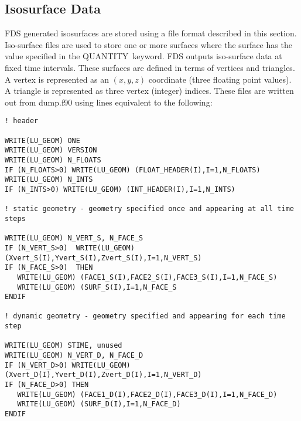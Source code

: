 \documentclass[12pt]{article}
\begin{document}
\subsection{Isosurface Data}
\label{out:ISOSURFACE}

FDS generated isosurfaces are stored using a
file format described in this section.
Iso-surface files are used to store one or more surfaces where the
surface has the value specified in the {\ct QUANTITY}\ keyword.
FDS outputs iso-surface data at fixed time intervals.
These surfaces are defined in terms of vertices and triangles.
A vertex is represented as an $(x,y,z)$ coordinate (three floating point values).
A triangle is represented as three vertex (integer) indices.
These files are written out from {\ct dump.f90} using lines equivalent to the following:
\begin{lstlisting}
! header

WRITE(LU_GEOM) ONE
WRITE(LU_GEOM) VERSION
WRITE(LU_GEOM) N_FLOATS
IF (N_FLOATS>0) WRITE(LU_GEOM) (FLOAT_HEADER(I),I=1,N_FLOATS)
WRITE(LU_GEOM) N_INTS
IF (N_INTS>0) WRITE(LU_GEOM) (INT_HEADER(I),I=1,N_INTS)

! static geometry - geometry specified once and appearing at all time steps

WRITE(LU_GEOM) N_VERT_S, N_FACE_S
IF (N_VERT_S>0)  WRITE(LU_GEOM) (Xvert_S(I),Yvert_S(I),Zvert_S(I),I=1,N_VERT_S)
IF (N_FACE_S>0)  THEN
   WRITE(LU_GEOM) (FACE1_S(I),FACE2_S(I),FACE3_S(I),I=1,N_FACE_S)
   WRITE(LU_GEOM) (SURF_S(I),I=1,N_FACE_S
ENDIF

! dynamic geometry - geometry specified and appearing for each time step

WRITE(LU_GEOM) STIME, unused
WRITE(LU_GEOM) N_VERT_D, N_FACE_D
IF (N_VERT_D>0) WRITE(LU_GEOM)(Xvert_D(I),Yvert_D(I),Zvert_D(I),I=1,N_VERT_D)
IF (N_FACE_D>0) THEN
   WRITE(LU_GEOM) (FACE1_D(I),FACE2_D(I),FACE3_D(I),I=1,N_FACE_D)
   WRITE(LU_GEOM) (SURF_D(I),I=1,N_FACE_D)
ENDIF
\end{lstlisting}
\end{document}
